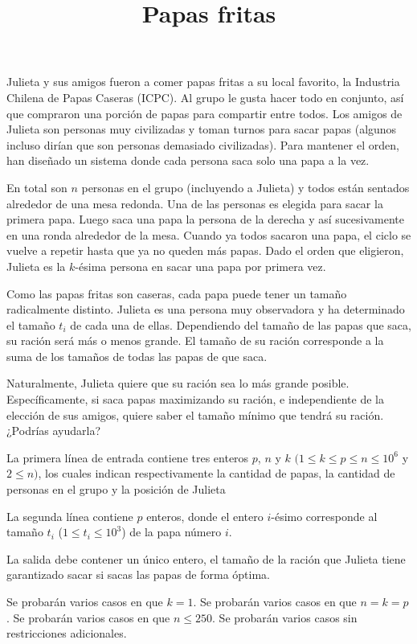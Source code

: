 \documentclass{oci}
\title{Papas fritas}
\begin{document}
\begin{problemDescription}
	Julieta y sus amigos fueron a comer papas fritas a su local favorito,
	la Industria Chilena de Papas Caseras (ICPC).
	Al grupo le gusta hacer todo en conjunto, así que compraron una porción
	de papas para compartir entre todos.
	Los amigos de Julieta son personas muy civilizadas y toman turnos para
	sacar papas (algunos incluso dirían que son personas demasiado civilizadas).
	Para mantener el orden, han diseñado un sistema donde cada
	persona saca solo una papa a la vez.

	En total son $n$ personas en el grupo (incluyendo a Julieta) y todos están
	sentados alrededor de una mesa redonda.
	Una de las personas es elegida para sacar la primera papa.
	Luego saca una papa la persona de la derecha y así sucesivamente en una
	ronda alrededor de la mesa.
	Cuando ya todos sacaron una papa, el ciclo se vuelve a repetir hasta que ya no
	queden más papas.
	Dado el orden que eligieron, Julieta es la $k$-ésima persona en sacar una papa
	por primera vez.

	Como las papas fritas son caseras, cada papa puede tener un tamaño radicalmente
	distinto.
	Julieta es una persona muy observadora y ha determinado el tamaño $t_i$ de cada una
	de ellas.
	Dependiendo del tamaño de las papas que saca, su ración será más o menos grande.
	El tamaño de su ración corresponde a la suma de los tamaños de todas
	las papas de que saca.

	Naturalmente, Julieta quiere que su ración sea lo más grande posible.
	Específicamente, si saca papas maximizando su ración, e independiente
	de la elección de sus amigos, quiere saber el tamaño mínimo que tendrá su ración.
	¿Podrías ayudarla?
\end{problemDescription}

\begin{inputDescription}
	La primera línea de entrada contiene tres enteros $p$, $n$ y $k$
	$(1 \leq k \leq p \leq n \leq 10^6$ y $2 \leq n)$, los cuales
	indican respectivamente la cantidad de papas, la cantidad de personas en el grupo
	y la posición de Julieta

	La segunda línea contiene $p$ enteros, donde el entero $i$-ésimo
	corresponde al tamaño $t_i$ ($1 \leq t_i \leq 10^3$) de la papa número $i$.
\end{inputDescription}

\begin{outputDescription}
	La salida debe contener un único entero, el tamaño de la ración que Julieta tiene
	garantizado sacar si sacas las papas de forma óptima.
\end{outputDescription}

\begin{scoreDescription}
  	Se probarán varios casos en que $k = 1$.
 	Se probarán varios casos en que $n = k = p$.
  	Se probarán varios casos en que $n \leq 250$.
	Se probarán varios casos sin restricciones adicionales.
\end{scoreDescription}

\begin{sampleDescription}
\end{sampleDescription}
\end{document}
